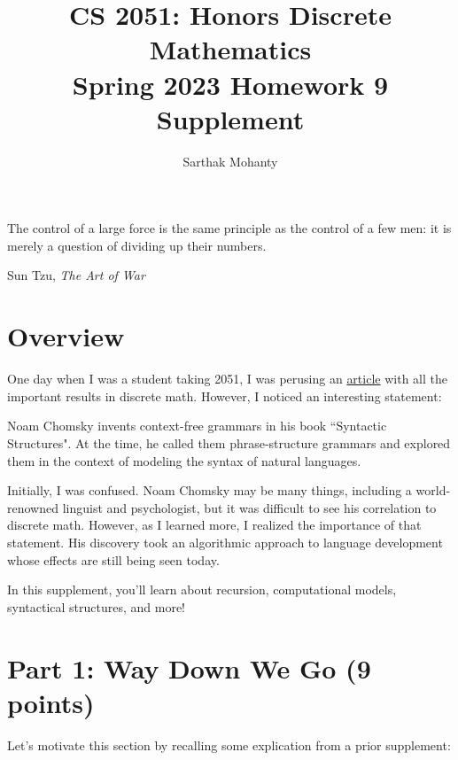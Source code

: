 \documentclass{article}
\title{\vspace{-1cm}CS 2051: Honors Discrete Mathematics \\Spring 2023 Homework 9 Supplement}
\author{Sarthak Mohanty}
\date{}
\begin{document}
\maketitle

\setlength{\epigraphwidth}{0.6\textwidth}
\epigraph{

The control of a large force is the same principle as the control of a few men: it is merely a question of dividing up their numbers.}{Sun Tzu, \textit{The Art of War}}

\section*{Overview}
    One day when I was a student taking 2051, I was perusing an \href{https://web.stanford.edu/class/archive/cs/cs103/cs103.1234/timeline_of_results}{article} with all the important results in discrete math. However, I noticed an interesting statement: 

    \begin{tcolorbox}
        Noam Chomsky invents context-free grammars in his book “Syntactic Structures". At the time, he called them phrase-structure grammars and explored them in the context of modeling the syntax of natural languages.
    \end{tcolorbox}
    Initially, I was confused. Noam Chomsky may be many things, including a world-renowned linguist and psychologist, but it was difficult to see his correlation to discrete math. However, as I learned more, I realized the importance of that statement. His discovery took an algorithmic approach to language development whose effects are still being seen today.

    \vspace{2mm}
    
    In this supplement, you'll learn about recursion, computational models, syntactical structures, and more!

\section*{Part 1: Way Down We Go (9 points)}
Let's motivate this section by recalling some explication from a prior supplement:
\end{document}
